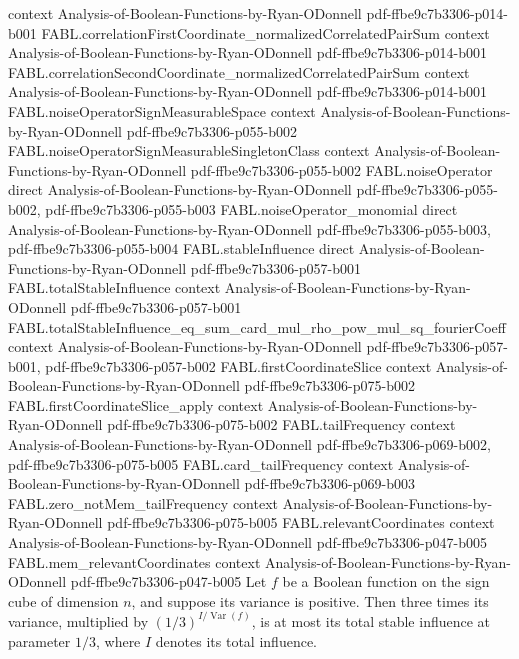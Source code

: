 \begin{theorem}
  {context}
  {Analysis-of-Boolean-Functions-by-Ryan-ODonnell}
  {pdf-ffbe9c7b3306-p014-b001}
\proofstep
  {FABL.correlationFirstCoordinate_normalizedCorrelatedPairSum}
  {context}
  {Analysis-of-Boolean-Functions-by-Ryan-ODonnell}
  {pdf-ffbe9c7b3306-p014-b001}
\proofstep
  {FABL.correlationSecondCoordinate_normalizedCorrelatedPairSum}
  {context}
  {Analysis-of-Boolean-Functions-by-Ryan-ODonnell}
  {pdf-ffbe9c7b3306-p014-b001}
\proofstep
  {FABL.noiseOperatorSignMeasurableSpace}
  {context}
  {Analysis-of-Boolean-Functions-by-Ryan-ODonnell}
  {pdf-ffbe9c7b3306-p055-b002}
\proofstep
  {FABL.noiseOperatorSignMeasurableSingletonClass}
  {context}
  {Analysis-of-Boolean-Functions-by-Ryan-ODonnell}
  {pdf-ffbe9c7b3306-p055-b002}
\proofstep
  {FABL.noiseOperator}
  {direct}
  {Analysis-of-Boolean-Functions-by-Ryan-ODonnell}
  {pdf-ffbe9c7b3306-p055-b002,
    pdf-ffbe9c7b3306-p055-b003}
\proofstep
  {FABL.noiseOperator_monomial}
  {direct}
  {Analysis-of-Boolean-Functions-by-Ryan-ODonnell}
  {pdf-ffbe9c7b3306-p055-b003,
    pdf-ffbe9c7b3306-p055-b004}
\proofstep
  {FABL.stableInfluence}
  {direct}
  {Analysis-of-Boolean-Functions-by-Ryan-ODonnell}
  {pdf-ffbe9c7b3306-p057-b001}
\proofstep
  {FABL.totalStableInfluence}
  {context}
  {Analysis-of-Boolean-Functions-by-Ryan-ODonnell}
  {pdf-ffbe9c7b3306-p057-b001}
\proofstep
  {FABL.totalStableInfluence_eq_sum_card_mul_rho_pow_mul_sq_fourierCoeff}
  {context}
  {Analysis-of-Boolean-Functions-by-Ryan-ODonnell}
  {pdf-ffbe9c7b3306-p057-b001,
    pdf-ffbe9c7b3306-p057-b002}
\proofstep
  {FABL.firstCoordinateSlice}
  {context}
  {Analysis-of-Boolean-Functions-by-Ryan-ODonnell}
  {pdf-ffbe9c7b3306-p075-b002}
\proofstep
  {FABL.firstCoordinateSlice_apply}
  {context}
  {Analysis-of-Boolean-Functions-by-Ryan-ODonnell}
  {pdf-ffbe9c7b3306-p075-b002}
\proofstep
  {FABL.tailFrequency}
  {context}
  {Analysis-of-Boolean-Functions-by-Ryan-ODonnell}
  {pdf-ffbe9c7b3306-p069-b002,
    pdf-ffbe9c7b3306-p075-b005}
\proofstep
  {FABL.card_tailFrequency}
  {context}
  {Analysis-of-Boolean-Functions-by-Ryan-ODonnell}
  {pdf-ffbe9c7b3306-p069-b003}
\proofstep
  {FABL.zero_notMem_tailFrequency}
  {context}
  {Analysis-of-Boolean-Functions-by-Ryan-ODonnell}
  {pdf-ffbe9c7b3306-p075-b005}
\proofstep
  {FABL.relevantCoordinates}
  {context}
  {Analysis-of-Boolean-Functions-by-Ryan-ODonnell}
  {pdf-ffbe9c7b3306-p047-b005}
\proofstep
  {FABL.mem_relevantCoordinates}
  {context}
  {Analysis-of-Boolean-Functions-by-Ryan-ODonnell}
  {pdf-ffbe9c7b3306-p047-b005}
Let $f$ be a Boolean function on the sign cube of dimension $n$, and suppose its
variance is positive. Then three times its variance, multiplied by
$(1/3)^{I/\operatorname{Var}(f)}$, is at most its total stable influence at parameter
$1/3$, where $I$ denotes its total influence.
\end{theorem}

